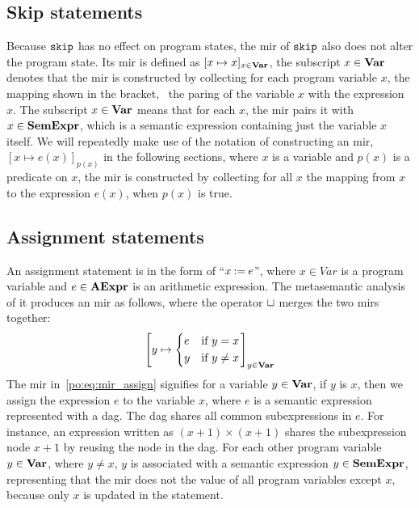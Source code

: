\subsection{Skip statements}

Because $\mathtt{skip}$ has no effect on program states, the \gls{mir} of
$\mathtt{skip}$ also does not alter the program state.  Its \gls{mir} is defined
as $[x \mapsto x]_{x \in \mathbf{Var}}$, the subscript $x \in \mathbf{Var}$ denotes that
the \gls{mir} is constructed by collecting for each program variable $x$, the
mapping shown in the bracket, \ie~the paring of the variable $x$ with the
expression $x$.  The subscript $x \in \mathbf{Var}$ means that for each $x$, the
\gls{mir} pairs it with $x \in \mathbf{SemExpr}$, which is a semantic expression
containing just the variable $x$ itself.  We will repeatedly make use of
the notation of constructing an \gls{mir}, $[x \mapsto e(x)]_{p(x)}$ in the
following sections, where $x$ is a variable and $p(x)$ is a predicate on $x$,
the \gls{mir} is constructed by collecting for all $x$ the mapping from $x$ to
the expression $e(x)$, when $p(x)$ is true.

\subsection{Assignment statements}

An assignment statement is in the form of ``$x \mathbin{:=} e$'', where $x \in
Var$ is a program variable and $e \in \mathbf{AExpr}$ is an arithmetic expression.
The metasemantic analysis of it produces an \gls{mir} as follows, where the
operator $\sqcup$ merges the two \glspl{mir} together:
\begin{equation}
    \left[
        y \mapsto \left\{
            \begin{aligned}
                & e && \text{if~} y = x \\
                & y && \text{if~} y \neq x
            \end{aligned}
        \right.
    \right]_{y \in \mathbf{Var}}
    \label{po:eq:mir_assign}
\end{equation}
The \gls{mir} in~\eqref{po:eq:mir_assign} signifies for a variable $y \in
\mathbf{Var}$, if $y$ is $x$, then we assign the expression $e$ to the variable
$x$, where $e$ is a semantic expression represented with a \gls{dag}\@.  The
\gls{dag} shares all common subexpressions in $e$.  For instance, an expression
written as $(x + 1) \times (x + 1)$ shares the subexpression node $x + 1$ by
reusing the node in the \gls{dag}\@.  For each other program variable $y \in
\mathbf{Var}$, where $y \neq x$, $y$ is associated with a semantic expression $y \in
\mathbf{SemExpr}$, representing that the \gls{mir} does not the value of all program
variables except $x$, because only $x$ is updated in the statement.


